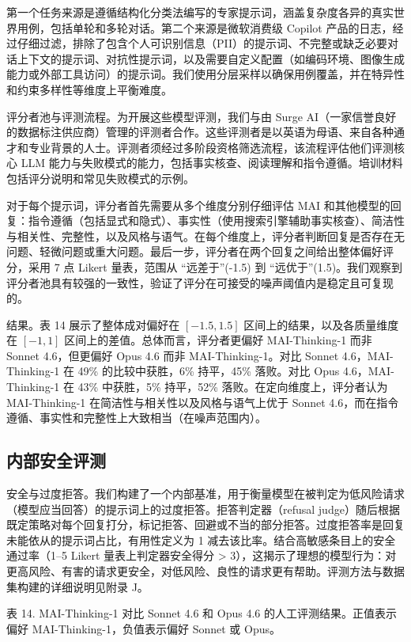 \documentclass[
  10
]{article}
\begin{document}
第一个任务来源是遵循结构化分类法编写的专家提示词，涵盖复杂度各异的真实世界用例，包括单轮和多轮对话。第二个来源是微软消费级 Copilot 产品的日志，经过仔细过滤，排除了包含个人可识别信息（PII）的提示词、不完整或缺乏必要对话上下文的提示词、对抗性提示词，以及需要自定义配置（如编码环境、图像生成能力或外部工具访问）的提示词。我们使用分层采样以确保用例覆盖，并在特异性和约束多样性等维度上平衡难度。

评分者池与评测流程。为开展这些模型评测，我们与由 Surge AI（一家信誉良好的数据标注供应商）管理的评测者合作。这些评测者是以英语为母语、来自各种通才和专业背景的人士。评测者须经过多阶段资格筛选流程，该流程评估他们评测核心 LLM 能力与失败模式的能力，包括事实核查、阅读理解和指令遵循。培训材料包括评分说明和常见失败模式的示例。

对于每个提示词，评分者首先需要从多个维度分别仔细评估 MAI 和其他模型的回复：指令遵循（包括显式和隐式）、事实性（使用搜索引擎辅助事实核查）、简洁性与相关性、完整性，以及风格与语气。在每个维度上，评分者判断回复是否存在无问题、轻微问题或重大问题。最后一步，评分者在两个回复之间给出整体偏好评分，采用 7 点 Likert 量表，范围从 ``远差于''(-1.5) 到 ``远优于''(1.5)。我们观察到评分者池具有较强的一致性，验证了评分在可接受的噪声阈值内是稳定且可复现的。

结果。表 14 展示了整体成对偏好在 $[-1.5, 1.5]$ 区间上的结果，以及各质量维度在 $[-1, 1]$ 区间上的差值。总体而言，评分者更偏好 MAI-Thinking-1 而非 Sonnet 4.6，但更偏好 Opus 4.6 而非 MAI-Thinking-1。对比 Sonnet 4.6，MAI-Thinking-1 在 49\% 的比较中获胜，6\% 持平，45\% 落败。对比 Opus 4.6，MAI-Thinking-1 在 43\% 中获胜，5\% 持平，52\% 落败。在定向维度上，评分者认为 MAI-Thinking-1 在简洁性与相关性以及风格与语气上优于 Sonnet 4.6，而在指令遵循、事实性和完整性上大致相当（在噪声范围内）。

\subsection{内部安全评测}\label{internal-safety-evaluation}

安全与过度拒答。我们构建了一个内部基准，用于衡量模型在被判定为低风险请求（模型应当回答）的提示词上的过度拒答。拒答判定器（refusal judge）随后根据既定策略对每个回复打分，标记拒答、回避或不当的部分拒答。过度拒答率是回复未能依从的提示词占比，有用性定义为 1 减去该比率。结合高敏感条目上的安全通过率（1--5 Likert 量表上判定器安全得分 >{} 3），这揭示了理想的模型行为：对更高风险、有害的请求更安全，对低风险、良性的请求更有帮助。评测方法与数据集构建的详细说明见附录 J。

表 14. MAI-Thinking-1 对比 Sonnet 4.6 和 Opus 4.6 的人工评测结果。正值表示偏好 MAI-Thinking-1，负值表示偏好 Sonnet 或 Opus。
\end{document}
